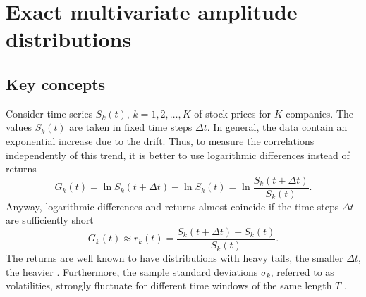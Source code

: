 \section{Exact multivariate amplitude distributions}
\label{sec:exact_distributions}


\subsection{Key concepts}\label{subsec:key_concepts}

Consider time series $S_{k} \left( t \right)$, $k = 1, 2, \ldots, K$ of stock
prices for $K$ companies. The values $S_{k} \left( t \right)$ are taken in
fixed time steps $\Delta t$. In general, the data contain an exponential
increase due to the drift. Thus, to measure the correlations independently of
this trend, it is better to use logarithmic differences instead of returns
\begin{equation}
    G_{k} \left( t \right) = \ln S_{k} \left( t + \Delta t \right) -
    \ln S_{k} \left(t \right) = \ln \frac{S_{k} \left( t + \Delta t \right)}
    {S_{k} \left(t \right)}.
\end{equation}
Anyway, logarithmic differences and returns almost coincide if the time steps
$\Delta t$ are sufficiently short \cite{subtle_nature,empirical_facts}
\begin{equation}
    G_{k} \left(t\right) \approx r_{k} \left(t\right)
    = \frac{S_{k} \left( t + \Delta t \right) - S_{k} \left( t \right)}
    {S_{k} \left( t \right)}.
\end{equation}
The returns are well known to have distributions with heavy tails, the smaller
$\Delta t$, the heavier
\cite{non_stationarity_fin_guhr}. Furthermore, the sample standard deviations
$\sigma_{k}$, referred to as volatilities, strongly fluctuate for different
time windows of the same length $T$
\cite{non_stationarity_fin_guhr,volatility_change}.

